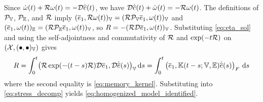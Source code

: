Since $\dot\omega(t)+{\mathcal{R}}\omega(t)=-{\mathcal{D}}\dot{\overline{e}}(t)$, we have ${\mathcal{D}}\dot{\overline{e}}(t)+\dot\omega(t)=-{\mathcal{R}}\omega(t)$. The definitions of ${\mathcal{P}}_{\mathbb{V}}$, ${\mathcal{P}}_{\mathbb{E}}$, and ${\mathcal{R}}$ imply $(\overline{e}_1,{\mathcal{R}}\omega(t))_{\mathbb{V}}=({\mathcal{R}}{\mathcal{P}}_{\mathbb{V}}\overline{e}_1,\omega(t))_{\mathbb{V}}$ and $(\overline{e}_1,\omega(t))_{\mathbb{E}}=({\mathcal{R}}{\mathcal{P}}_{\mathbb{E}}\overline{e}_1,\omega(t))_{\mathbb{V}}$, so $R=-({\mathcal{R}}{\mathcal{D}}\overline{e}_1,\omega(t))_{\mathbb{V}}$. Substituting \cref{eq:eta_sol} and using the self-adjointness and commutativity of ${\mathcal{R}}$ and $\exp(-t{\mathcal{R}})$ on $({\mathcal{X}},(\bullet,\bullet)_{\mathbb{V}})$ gives
\begin{equation*}
    R=\int_0^t\bigl({\mathcal{R}}\exp(-(t-s){\mathcal{R}}){\mathcal{D}}\overline{e}_1,{\mathcal{D}}\dot{\overline{e}}(s)\bigr)_{\mathbb{V}}\,\mathrm{d}s=\int_0^t\left(\overline{e}_1, \mathbb{K}(t-s;\mathbb{V},\mathbb{E})\dot{\overline{e}}(s)\right)_F\,\mathrm{d}s
\end{equation*}
where the second equality is \cref{eq:memory_kernel}. Substituting into \cref{eq:stress_decomp} yields \cref{eq:homogenized_model_identified}.
